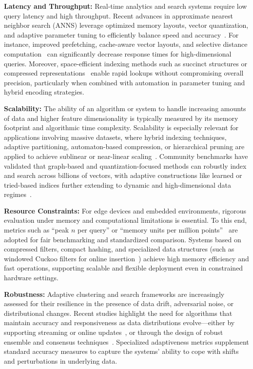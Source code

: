 \documentclass[sigconf]{acmart}
\begin{document}
\textbf{Latency and Throughput:} Real-time analytics and search systems require low query latency and high throughput. Recent advances in approximate nearest neighbor search (ANNS) leverage optimized memory layouts, vector quantization, and adaptive parameter tuning to efficiently balance speed and accuracy~\cite{ref59, ref60, ref117, ref118, ref109}. For instance, improved prefetching, cache-aware vector layouts, and selective distance computation~\cite{ref77, ref78} can significantly decrease response times for high-dimensional queries. Moreover, space-efficient indexing methods such as succinct structures or compressed representations~\cite{ref106, ref79, ref80, ref81, ref87, ref108} enable rapid lookups without compromising overall precision, particularly when combined with automation in parameter tuning and hybrid encoding strategies.

\textbf{Scalability:} The ability of an algorithm or system to handle increasing amounts of data and higher feature dimensionality is typically measured by its memory footprint and algorithmic time complexity. Scalability is especially relevant for applications involving massive datasets, where hybrid indexing techniques, adaptive partitioning, automaton-based compression, or hierarchical pruning are applied to achieve sublinear or near-linear scaling~\cite{ref59, ref79, ref80, ref81, ref106, ref108, ref116}. Community benchmarks have validated that graph-based and quantization-focused methods can robustly index and search across billions of vectors, with adaptive constructions like learned or tried-based indices further extending to dynamic and high-dimensional data regimes~\cite{ref110, ref108}.

\textbf{Resource Constraints:} For edge devices and embedded environments, rigorous evaluation under memory and computational limitations is essential. To this end, metrics such as ``peak $n$ per query'' or ``memory units per million points''~\cite{ref60, ref79, ref86, ref87} are adopted for fair benchmarking and standardized comparison. Systems based on compressed filters, compact hashing, and specialized data structures (such as windowed Cuckoo filters for online insertion~\cite{ref87}) achieve high memory efficiency and fast operations, supporting scalable and flexible deployment even in constrained hardware settings.

\textbf{Robustness:} Adaptive clustering and search frameworks are increasingly assessed for their resilience in the presence of data drift, adversarial noise, or distributional changes. Recent studies highlight the need for algorithms that maintain accuracy and responsiveness as data distributions evolve---either by supporting streaming or online updates~\cite{ref64, ref108, ref110}, or through the design of robust ensemble and consensus techniques~\cite{ref116, ref117}. Specialized adaptiveness metrics supplement standard accuracy measures to capture the systems' ability to cope with shifts and perturbations in underlying data.
\end{document}
